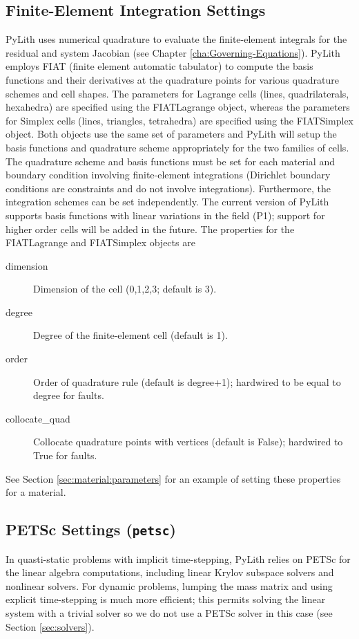 \subsection{Finite-Element Integration Settings}

PyLith uses numerical quadrature to evaluate the finite-element integrals
for the residual and system Jacobian (see Chapter \ref{cha:Governing-Equations}).
PyLith employs FIAT (finite element automatic tabulator) to compute
the basis functions and their derivatives at the quadrature points
for various quadrature schemes and cell shapes. The parameters for
Lagrange cells (lines, quadrilaterals, hexahedra) are specified using
the FIATLagrange object, whereas the parameters for Simplex cells
(lines, triangles, tetrahedra) are specified using the FIATSimplex
object. Both objects use the same set of parameters and PyLith will
setup the basis functions and quadrature scheme appropriately for
the two families of cells. The quadrature scheme and basis functions
must be set for each material and boundary condition involving finite-element
integrations (Dirichlet boundary conditions are constraints and do
not involve integrations). Furthermore, the integration schemes can
be set independently. The current version of PyLith supports basis
functions with linear variations in the field (P1); support for higher
order cells will be added in the future. The properties for the FIATLagrange
and FIATSimplex objects are
\begin{description}
\item [{dimension}] Dimension of the cell (0,1,2,3; default is 3).
\item [{degree}] Degree of the finite-element cell (default is 1).
\item [{order}] Order of quadrature rule (default is degree+1); hardwired
to be equal to degree for faults.
\item [{collocate\_quad}] Collocate quadrature points with vertices (default
is False); hardwired to True for faults.
\end{description}
See Section \ref{sec:material:parameters} for an example of setting
these properties for a material.


\subsection{\label{sec:petsc:options}PETSc Settings (\texttt{petsc})}

In quasti-static problems with implicit time-stepping, PyLith relies
on PETSc for the linear algebra computations, including linear Krylov
subspace solvers and nonlinear solvers. For dynamic problems, lumping
the mass matrix and using explicit time-stepping is much more efficient;
this permits solving the linear system with a trivial solver so we
do not use a PETSc solver in this case (see Section \ref{sec:solvers}).


